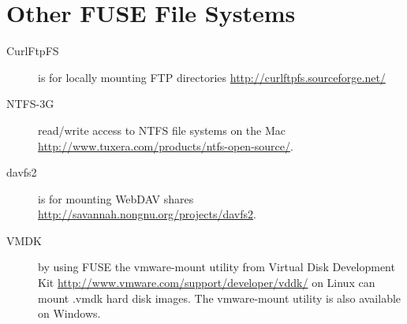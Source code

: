 \section{Other FUSE File Systems}

\begin{description}
\item[CurlFtpFS] is for locally  mounting FTP directories 
  \url{http://curlftpfs.sourceforge.net/}

\item[NTFS-3G] read/write access to NTFS file systems on the Mac
  \url{http://www.tuxera.com/products/ntfs-open-source/}.

\item[davfs2]        is        for        mounting        WebDAV        shares
  \url{http://savannah.nongnu.org/projects/davfs2}.

\item[VMDK]  by  using  FUSE   the  vmware-mount  utility  from  Virtual  Disk
  Development Kit \url{http://www.vmware.com/support/developer/vddk/} on Linux
  can mount .vmdk hard disk images. The vmware-mount utility is also available
  on Windows.
\end{description}

